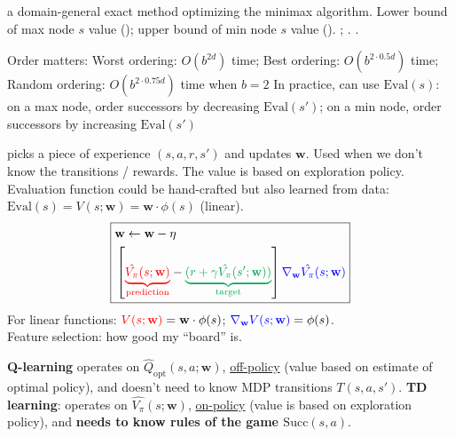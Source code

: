 a domain-general exact method optimizing the minimax
algorithm. Lower bound of max node $s$ value ();
upper bound of min node $s$ value ().
;
.
.

Order matters: Worst ordering: $O(b^{2d})$ time; Best ordering:
$O(b^{2\cdot0.5d})$ time; Random ordering: $O(b^{2\cdot0.75d})$ time when $b =
2$
In practice, can use $\text{Eval}(s)$: on a max node, order successors by
decreasing $\text{Eval}(s')$; on a min node, order successors by increasing
$\text{Eval}(s')$

 picks a piece of experience
$(s,a,r,s')$ and updates $\mathbf{w}$. Used when we don't know the transitions /
rewards. The value is based on exploration policy.\\
Evaluation function could be hand-crafted but also learned from data:
$\text{Eval}(s) = V(s;\mathbf{w}) = \mathbf{w}\cdot\phi(s)$ (linear).\\
\begin{displaymath}
\boxed{
\begin{split}
    &\mathbf{w} \leftarrow \mathbf{w} - \eta \\
    &\left[\textcolor{red}{\underbrace{\hat{V_\pi}(s;\mathbf{w})}_{\text{prediction}}}
    - \textcolor{Green}{\underbrace{(r + \gamma
    \hat{V_\pi}(s';\mathbf{w}))}_{\text{target}}}\right]
    \textcolor{blue}{\nabla_{\mathbf{w}}\hat{V_\pi}(s;\mathbf{w})}
\end{split}
}
\end{displaymath}
For linear functions: $\textcolor{red}{V(s;\mathbf{w})} = \mathbf{w} \cdot
\phi(s)$; $\textcolor{blue}{\nabla_{\mathbf{w}}V(s;\mathbf{w})} = \phi(s)$.
\\
Feature selection: how good my ``board'' is.

 \textbf{Q-learning} operates on
$\hat{Q}_{\text{opt}}(s,a;\mathbf{w})$, \underline{off-policy} (value based on
estimate of optimal policy), and doesn't need to know MDP transitions
$T(s,a,s')$. \textbf{TD learning}: operates on $\hat{V_\pi}(s;\mathbf{w})$,
\underline{on-policy} (value is based on exploration policy), and \textbf{needs
to know rules of the game $\text{Succ}(s,a)$}.

